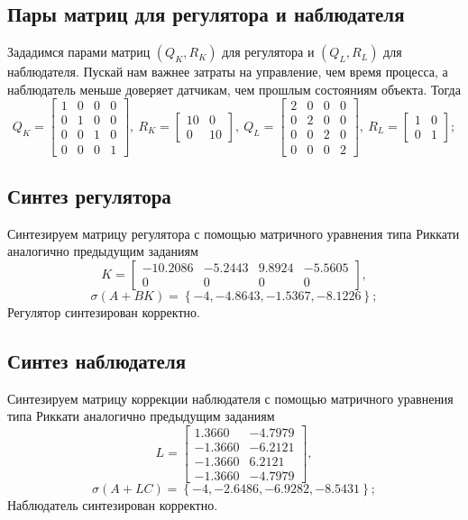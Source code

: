 \documentclass[a4paper, 12pt]{article}
\begin{document}
    
    \subsection{Пары матриц для регулятора и наблюдателя}
    Зададимся парами матриц $\left( Q_K,R_K \right)$ для регулятора и $\left( Q_L,R_L \right)$
    для наблюдателя. Пускай нам важнее затраты на управление, чем время процесса,
    а наблюдатель меньше доверяет датчикам, чем прошлым состояниям объекта. Тогда
    $$
    Q_K=\begin{bmatrix}
        1 &0 &0 &0\\
        0 &1 &0 &0\\
        0 &0 &1 &0\\
        0 &0 &0 &1
    \end{bmatrix},\ R_K=\begin{bmatrix}
        10 &0\\
        0 &10
    \end{bmatrix},\ Q_L=\begin{bmatrix}
        2 &0 &0 &0\\
        0 &2 &0 &0\\
        0 &0 &2 &0\\
        0 &0 &0 &2
    \end{bmatrix},\ R_L=\begin{bmatrix}
        1 &0\\
        0 &1
    \end{bmatrix};
    $$


    \subsection{Синтез регулятора}
    Синтезируем матрицу регулятора с помощью матричного уравнения типа Риккати аналогично предыдущим заданиям
    $$
    K=\begin{bmatrix}
        -10.2086   &-5.2443    &9.8924   &-5.5605\\
         0         &0         &0         &0
    \end{bmatrix},
    $$
    $$
    \sigma\left( A+BK \right)=\left\{ -4,-4.8643,-1.5367,-8.1226 \right\};
    $$
    Регулятор синтезирован корректно.


    \subsection{Синтез наблюдателя}
    Синтезируем матрицу коррекции наблюдателя с помощью матричного уравнения типа Риккати
    аналогично предыдущим заданиям
    $$
    L=\begin{bmatrix}
        1.3660   &-4.7979\\
   -1.3660   &-6.2121\\
   -1.3660    &6.2121\\
   -1.3660   &-4.7979
    \end{bmatrix},
    $$
    $$
    \sigma\left( A+LC \right)=\left\{ -4,-2.6486,-6.9282,-8.5431 \right\};
    $$
    Наблюдатель синтезирован корректно.
\end{document}
